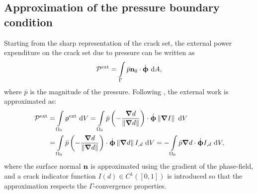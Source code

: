 \subsection{Approximation of the pressure boundary condition}
\label{section: Chapter3/theory/pressure}

Starting from the sharp representation of the crack set, the external power expenditure on the crack set due to pressure can be written as
\begin{align}
  \mathcal{P}^\text{ext} = \int\limits_{\Gamma} \bar{p}\textbf{n}_0\cdot\dot{\boldsymbol{\upphi}} \text{ d}A,
\end{align}
where $\bar{p}$ is the magnitude of the pressure. Following \cite{CHUKWUDOZIE2019957}, the external work is approximated as:
\begin{equation}
  \begin{aligned}
    \mathcal{P}^\text{ext} & = \int\limits_{\Omega_0} \uprho^\text{ext} \text{ d}V = \int\limits_{\Omega_0} \bar{p} \left( -\dfrac{\boldsymbol{\nabla} d}{\left\lVert\boldsymbol{\nabla} d\right\rVert} \right) \cdot \dot{\boldsymbol{\upphi}} \left\lVert\boldsymbol{\nabla} I\right\rVert \text{ d}V \\
                           & = \int\limits_{\Omega_0} \bar{p} \left( -\dfrac{\boldsymbol{\nabla} d}{\left\lVert\boldsymbol{\nabla} d\right\rVert} \right) \cdot \dot{\boldsymbol{\upphi}} \left\lVert\boldsymbol{\nabla} d\right\rVert I_{,d} \text{ d}V                                             
    = - \int\limits_{\Omega_0} \bar{p} \boldsymbol{\nabla} d \cdot \dot{\boldsymbol{\upphi}} I_{,d} \text{ d}V,
  \end{aligned}
  \label{eq: pressure power}
\end{equation}
where the surface normal $\textbf{n}$ is approximated using the gradient of the phase-field, and a crack indicator function $I(d) \in C^1([0,1])$ is introduced so that the approximation respects the $\Gamma$-convergence properties.

